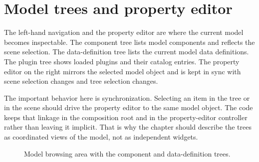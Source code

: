 \section{Model trees and property editor}
\label{sec:main-graphical-application-trees}

The left-hand navigation and the property editor are where the current model
becomes inspectable. The component tree lists model components and reflects the
scene selection. The data-definition tree lists the current model data
definitions. The plugin tree shows loaded plugins and their catalog entries.
The property editor on the right mirrors the selected model object and is kept
in sync with scene selection changes and tree selection changes.

The important behavior here is synchronization. Selecting an item in the tree
or in the scene should drive the property editor to the same model object. The
code keeps that linkage in the composition root and in the property-editor
controller rather than leaving it implicit. That is why the chapter should
describe the trees as coordinated views of the model, not as independent
widgets.

\begin{figure}[htbp]
\centering
{}
\caption{Model browsing area with the component and data-definition trees.}
\label{fig:main-graphical-component-tree}
\end{figure}

